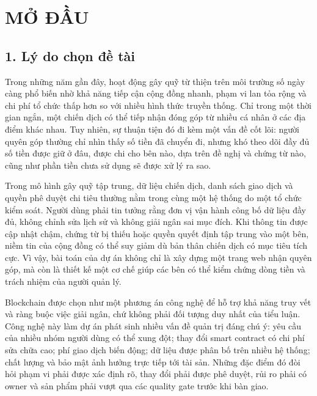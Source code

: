 \chapter*{MỞ ĐẦU}

\section*{1. Lý do chọn đề tài}

Trong những năm gần đây, hoạt động gây quỹ từ thiện trên môi trường số ngày càng phổ biến nhờ khả năng tiếp cận cộng đồng nhanh, phạm vi lan tỏa rộng và chi phí tổ chức thấp hơn so với nhiều hình thức truyền thống. Chỉ trong một thời gian ngắn, một chiến dịch có thể tiếp nhận đóng góp từ nhiều cá nhân ở các địa điểm khác nhau. Tuy nhiên, sự thuận tiện đó đi kèm một vấn đề cốt lõi: người quyên góp thường chỉ nhìn thấy số tiền đã chuyển đi, nhưng khó theo dõi đầy đủ số tiền được giữ ở đâu, được chi cho bên nào, dựa trên đề nghị và chứng từ nào, cũng như phần tiền chưa sử dụng sẽ được xử lý ra sao.

Trong mô hình gây quỹ tập trung, dữ liệu chiến dịch, danh sách giao dịch và quyền phê duyệt chi tiêu thường nằm trong cùng một hệ thống do một tổ chức kiểm soát. Người dùng phải tin tưởng rằng đơn vị vận hành công bố dữ liệu đầy đủ, không chỉnh sửa lịch sử và không giải ngân sai mục đích. Khi thông tin được cập nhật chậm, chứng từ bị thiếu hoặc quyền quyết định tập trung vào một bên, niềm tin của cộng đồng có thể suy giảm dù bản thân chiến dịch có mục tiêu tích cực. Vì vậy, bài toán của dự án không chỉ là xây dựng một trang web nhận quyên góp, mà còn là thiết kế một cơ chế giúp các bên có thể kiểm chứng dòng tiền và trách nhiệm của người quản lý.

Blockchain được chọn như một phương án công nghệ để hỗ trợ khả năng truy vết và ràng buộc việc giải ngân, chứ không phải đối tượng duy nhất của tiểu luận. Công nghệ này làm dự án phát sinh nhiều vấn đề quản trị đáng chú ý: yêu cầu của nhiều nhóm người dùng có thể xung đột; thay đổi smart contract có chi phí sửa chữa cao; phí giao dịch biến động; dữ liệu được phân bố trên nhiều hệ thống; chất lượng và bảo mật ảnh hưởng trực tiếp tới tài sản. Những đặc điểm đó đòi hỏi phạm vi phải được xác định rõ, thay đổi phải được phê duyệt, rủi ro phải có owner và sản phẩm phải vượt qua các quality gate trước khi bàn giao.


